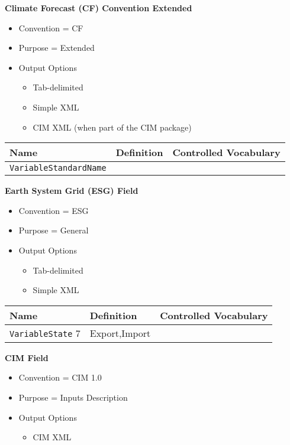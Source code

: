 {\bf Climate Forecast (CF) Convention Extended}

\begin{itemize}
    \item Convention = CF
    \item Purpose = Extended
    \item Output Options
    \begin{itemize}
        \item Tab-delimited
        \item Simple XML
        \item CIM XML (when part of the CIM package)
    \end{itemize} 
\end{itemize}

\begin{tabular}{|p{8cm}|p{20cm}|p{10cm}|}
    {\bf Name } & {\bf Definition} & {\bf Controlled Vocabulary} \\
    \hline\hline
    {\tt VariableStandardName} & & \\
\end{tabular}


{\bf Earth System Grid (ESG) Field}

\begin{itemize}
    \item Convention = ESG
    \item Purpose = General
    \item Output Options
    \begin{itemize}
        \item Tab-delimited
        \item Simple XML
    \end{itemize} 
\end{itemize}

\begin{tabular}{|p{8cm}|p{20cm}|p{10cm}|}
     {\bf Name } & {\bf Definition} & {\bf Controlled Vocabulary} \\
     \hline\hline
     {\tt VariableState} 7  & Export,Import\\
\end{tabular}


{\bf CIM Field}
\label{CIMFieldAttributePackages}

\begin{itemize}
    \item Convention = CIM 1.0
    \item Purpose = Inputs Description
\item Output Options
    \begin{itemize}
        \item CIM XML 
    \end{itemize} 
\end{itemize}

